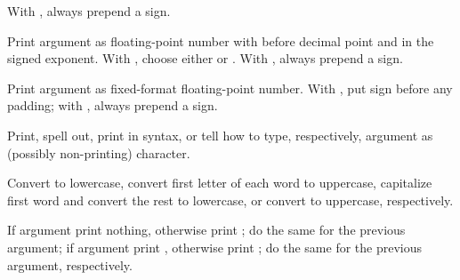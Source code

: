 \begin{LIST}{1cm}
\begin{LIST}{.5cm}
    {%
       With
      , always pre\-pend a sign. 
    }

    {%
      Print argument as floating-point number with 
      before decimal point and  in the signed
      exponent. With , choose either  or
      . With , always prepend a sign. 
    }

    {%
      Print argument as fixed-format floating-point number. With \KWD{:},
      put sign before any padding; with , always prepend a sign.}

    {%
      Print, spell out, print in \kwd{\#$\backslash$} syntax, or tell
      how to type, respectively, argument as (possibly non-printing)
      character. 
    }

    {%
      Convert  to lowercase, convert first letter of each word
      to uppercase, capitalize first word and convert the rest to
      lowercase, or convert to uppercase, respectively. 
    }

    {%
      If argument   print nothing, otherwise print ;
      do the same for the previous argument; if argument  
      print , otherwise print ; do the same for the
      previous argument, respectively.  
    }


\end{LIST}
\end{LIST}

